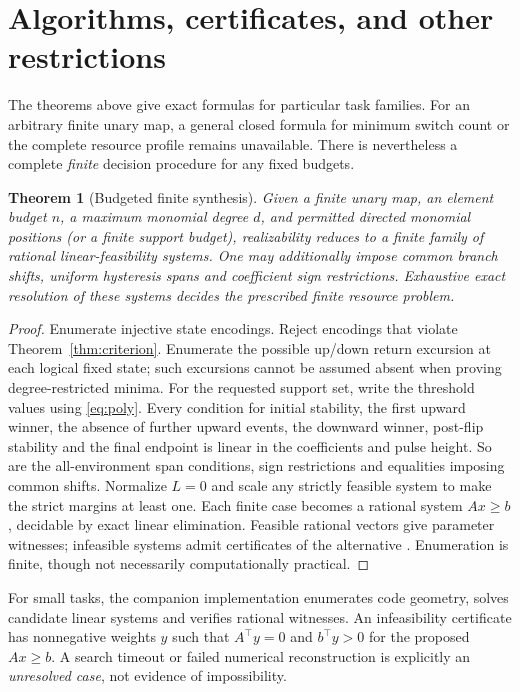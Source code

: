 \documentclass[12pt,letterpaper]{article}
\newtheorem{theorem}{Theorem}[section]
\theoremstyle{definition}\newtheorem{definition}[theorem]{Definition}
\theoremstyle{remark}\newtheorem{remark}[theorem]{Remark}
\begin{document}
\section{Algorithms, certificates, and other restrictions}\label{sec:algorithm}
The theorems above give exact formulas for particular task families. For an arbitrary finite unary map, a general closed formula for minimum switch count or the complete resource profile remains unavailable. There is nevertheless a complete \emph{finite} decision procedure for any fixed budgets.

\begin{theorem}[Budgeted finite synthesis]\label{thm:synthesis}
Given a finite unary map, an element budget $n$, a maximum monomial degree $d$, and permitted directed monomial positions (or a finite support budget), realizability reduces to a finite family of rational linear-feasibility systems. One may additionally impose common branch shifts, uniform hysteresis spans and coefficient sign restrictions. Exhaustive exact resolution of these systems decides the prescribed finite resource problem.
\end{theorem}
\begin{proof}
Enumerate injective state encodings. Reject encodings that violate Theorem~\ref{thm:criterion}. Enumerate the possible up/down return excursion at each logical fixed state; such excursions cannot be assumed absent when proving degree-restricted minima. For the requested support set, write the threshold values using \eqref{eq:poly}. Every condition for initial stability, the first upward winner, the absence of further upward events, the downward winner, post-flip stability and the final endpoint is linear in the coefficients and pulse height. So are the all-environment span conditions, sign restrictions and equalities imposing common shifts. Normalize $L=0$ and scale any strictly feasible system to make the strict margins at least one. Each finite case becomes a rational system $Ax\ge b$, decidable by exact linear elimination. Feasible rational vectors give parameter witnesses; infeasible systems admit certificates of the alternative \citep{farkas1902}. Enumeration is finite, though not necessarily computationally practical.
\end{proof}

For small tasks, the companion implementation enumerates code geometry, solves candidate linear systems and verifies rational witnesses. An infeasibility certificate has nonnegative weights $y$ such that $A^\top y=0$ and $b^\top y>0$ for the proposed $Ax\ge b$. A search timeout or failed numerical reconstruction is explicitly an \emph{unresolved case}, not evidence of impossibility.
\end{document}
